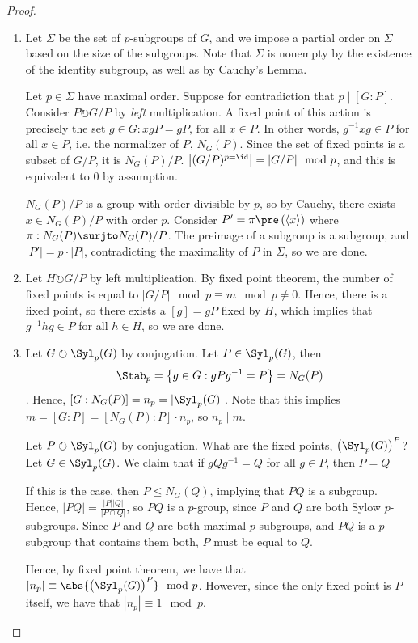 \documentclass[12pt]{scrartcl}
\begin{document}
\begin{proof}
	\begin{enumerate}[label=\alph*)]
		\item Let $\Sigma$ be the set of $p$-subgroups of $G$, and we impose a partial order on $\Sigma$ based on the size of the subgroups.
			Note that $\Sigma$ is nonempty by the existence of the identity subgroup, as well as by Cauchy's Lemma.

			Let $p \in \Sigma$ have maximal order.
			Suppose for contradiction that $p \mid [G: P]$.
			Consider $P \circlearrowright G/P$ by \emph{left} multiplication. 
			A fixed point of this action is precisely the set $g \in G: xgP = gP\textrm{, for all } x \in P$.
			In other words, $g^{-1}xg \in P$ for all $x \in P$, i.e. the normalizer of $P$, $N_G(P)$.
			Since the set of fixed points is a subset of $G/P$,  it is $N_G(P)/P$.
			$\left|(G/P)^{p = \id}\right| = |G/P| \mod p$, and this is equivalent to $0$ by assumption.

			$N_G(P)/P$ is a group with order divisible by $p$, so by Cauchy, there exists $x \in N_G(P)/P$ with order $p$.
			Consider $P' = \pi\pre\left(\langle x\rangle\right)$ where $\pi: N_G(P) \surjto N_G(P)/P$.
		The preimage of a subgroup is a subgroup, and $|P'| = p \cdot |P|$, contradicting the maximality of $P$ in $\Sigma$, so we are done.   

	\item Let $H \circlearrowright G/P$ by left multiplication.
		By fixed point theorem, the number of fixed points is equal to $|G/P| \mod p \equiv m \mod p \neq 0$.
		Hence, there is a fixed point, so there exists a $[g] = gP$ fixed by $H$, which implies that $g^{-1}hg \in P$ for all $h \in H$, so we are done.

	\item Let $G \circlearrowright \Syl_p(G)$ by conjugation.
		Let $P \in \Syl_p(G)$, then 
		\[
			\Stab_p = \left\{g \in G: gPg^{-1} = P\right\} = N_G(P)
		\].
		Hence, $[G: N_G(P)] = n_p = |\Syl_p(G)|$.
		Note that this implies $m = [G: P] = [N_G(P) : P] \cdot n_p$, so $n_p \mid m$.

		Let $P \circlearrowright \Syl_p(G)$ by conjugation.
		What are the fixed points, $\left(\Syl_p(G)\right)^P$?
		Let $G \in \Syl_p(G)$.
		We claim that if $gQg^{-1} = Q$ for all $g \in P$, then $P = Q$

		If this is the case, then $P \leq N_G(Q)$, implying that $PQ$ is a subgroup.
		Hence, $|PQ| = \frac{|P||Q|}{|P \cap Q|}$, so $PQ$ is a $p$-group, since $P$ and $Q$ are both Sylow $p$-subgroups.
		Since $P$ and $Q$ are both maximal $p$-subgroups, and $PQ$ is a $p$-subgroup that contains them both, $P$ must be equal to $Q$.

		Hence, by fixed point theorem, we have that $|n_p| \equiv \abs{\left(\Syl_p(G)\right)^P} \mod p$.
		However, since the only fixed point is $P$ itself, we have that $|n_p| \equiv 1 \mod p$. 
\end{enumerate}
\end{proof}
\end{document}

